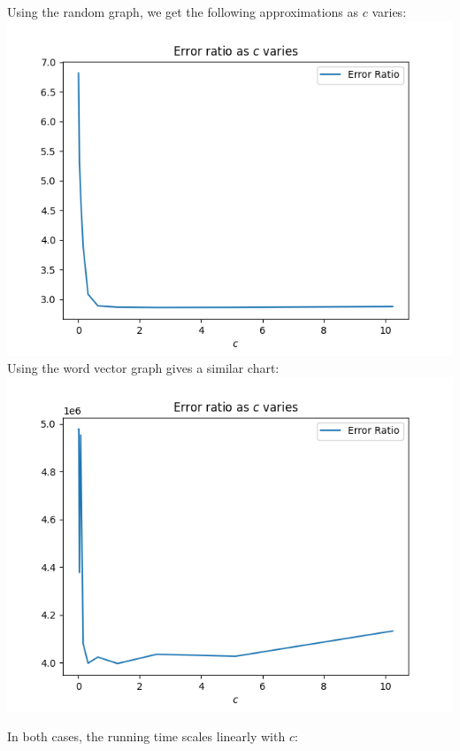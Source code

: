 \documentclass[
]{article}
\begin{document}
Using the random graph, we get the following approximations as {\(c\)}
varies:\\
\includegraphics{images/error_ratio_as_c_varies.png}\\
Using the word vector graph gives a similar chart:\\
\includegraphics{images/error_ratio_as_c_varies_word_vector.png}

In both cases, the running time scales linearly with {\(c\)}:
\end{document}
